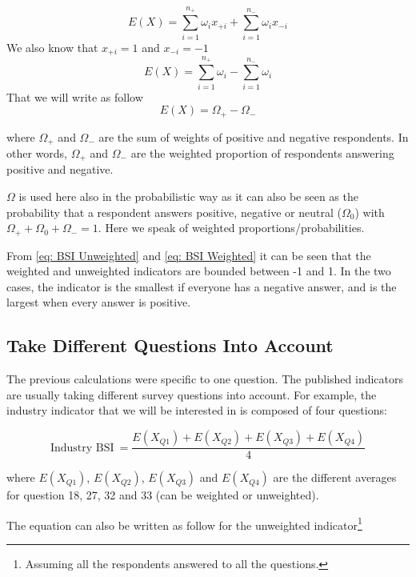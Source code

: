 \documentclass[12pt,a4paper,oneside]{book}
\begin{document}
\begin{equation}
    E(X) = \sum_{i=1}^{n_+} \omega_{i} x_{+i} + \sum_{i=1}^{n_-} \omega_{i} x_{-i}
\end{equation} 
We also know that $x_{+i} = 1$  and $x_{-i}=-1$  
\begin{equation}
    E(X) = \sum_{i=1}^{n_+} \omega_{i}  - \sum_{i=1}^{n_-} \omega_{i}
\end{equation}
That we will write as follow
\begin{equation}
    E(X) = \Omega_+ - \Omega_- \label{eq: BSI Weighted}
\end{equation}

where $\Omega_+$ and $\Omega_-$ are the sum of weights of positive and negative respondents. 
In other words, $\Omega_+$ and $\Omega_-$ are the weighted proportion of respondents answering positive and negative. 

$\Omega$ is used here also in the probabilistic way as it can also be seen as the probability that a respondent answers positive, negative or neutral ($\Omega_0$) with $\Omega_+ + \Omega_0 + \Omega_- =1$. Here we speak of weighted proportions/probabilities.

From \autoref{eq: BSI Unweighted} and \autoref{eq: BSI Weighted} it can be seen that the weighted and unweighted indicators are bounded between -1 and 1. In the two cases, the indicator is the smallest if everyone has a negative answer, and is the largest when every answer is positive.

\subsection{Take Different Questions Into Account}

The previous calculations were specific to one question. The published indicators are usually taking different survey questions into account. For example, the industry indicator that we will be interested in is composed of four questions:

\begin{equation}
    \mbox{Industry BSI}\ = \frac{E(X_{Q1}) + E(X_{Q2}) + E(X_{Q3}) + E(X_{Q4})}{4}
\end{equation}

where 
$E(X_{Q1})$, $E(X_{Q2})$, $E(X_{Q3})$ and $E(X_{Q4})$ are the different averages for question 18, 27, 32 and 33 (can be weighted or unweighted).

The equation can also be written as follow for the unweighted indicator\footnote{Assuming all the respondents answered to all the questions.}
\end{document}
